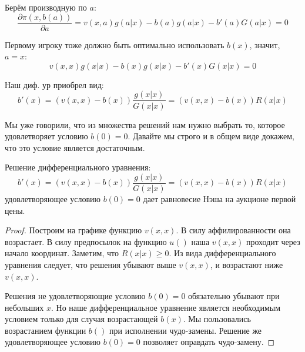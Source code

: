 \begin{itemize}
Берём производную по $ a $:
\begin{equation}
\frac{\partial \pi(x,b(a))}{\partial a}=v(x,a)g(a|x)-b(a)g(a|x)-b'(a)G(a|x)=0
\end{equation}

Первому игроку тоже должно быть оптимально использовать $ b(x) $, значит, $ a=x $:
\begin{equation}
v(x,x)g(x|x)-b(x)g(x|x)-b'(x)G(x|x)=0
\end{equation}

Наш диф. ур приобрел вид:
\begin{equation}
\label{b_first_de}
b'(x)=(v(x,x)-b(x))\frac{g(x|x)}{G(x|x)}=(v(x,x)-b(x))R(x|x)
\end{equation}

Мы уже говорили, что из множества решений нам нужно выбрать то, которое удовлетворяет условию $ b(0)=0 $. Давайте мы строго и в общем виде докажем, что это условие является достаточным.


\begin{myth}
Решение дифференциального уравнения:
\begin{equation}
b'(x)=(v(x,x)-b(x))\frac{g(x|x)}{G(x|x)}=(v(x,x)-b(x))R(x|x)
\end{equation}
удовлетворяющее условию $ b(0)=0 $ дает равновесие Нэша на аукционе первой цены.
\end{myth}

\begin{proof}


Построим на графике функцию $ v(x,x) $. В силу аффилированности она возрастает. В силу предпосылок на функцию $ u() $ наша $ v(x,x) $ проходит через начало координат. Заметим, что $ R(x|x)\geq 0 $. Из вида дифференциального уравнения следует, что решения убывают выше $ v(x,x) $, и возрастают ниже $ v(x,x) $.




Решения не удовлетворяющие условию $ b(0)=0 $ обязательно убывают при небольших $ x $. Но наше дифференциальное уравнение является необходимым условием только для случая возрастающей $ b(x) $. Мы пользовались возрастанием функции $ b() $ при исполнении чудо-замены. Решение же удовлетворяющее условию $ b(0)=0 $ позволяет оправдать чудо-замену.


\end{proof}
\end{itemize}
